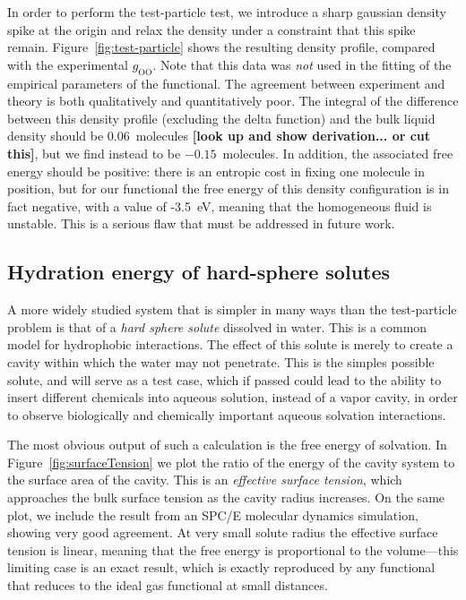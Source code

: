 \documentclass[letterpaper,twocolumn,amsmath,amssymb,prb]{revtex4-1}
\newcommand{\red}[1]{{\bf \color{red} #1}}
\newcommand{\fixme}[1]{\red{[#1]}}
\begin{document}
In order to perform the test-particle test, we introduce a sharp
gaussian density spike at the origin and relax the density under a
constraint that this spike remain.  Figure~\ref{fig:test-particle}
shows the resulting density profile, compared with the experimental
$g_{\textrm{OO}}$.  Note that this data was \emph{not} used in the
fitting of the empirical parameters of the functional.  The agreement
between experiment and theory is both qualitatively and quantitatively
poor.  The integral of the difference between this density profile
(excluding the delta function) and the bulk liquid density should be
0.06~molecules \fixme{look up and show derivation... or cut this},
but we find instead to be $-0.15$~molecules.  In addition, the associated
free energy should be positive: there is an entropic cost in fixing
one molecule in position, but for our functional the free energy of
this density configuration is in fact negative, with a value of
-3.5~eV, meaning that the homogeneous fluid is unstable.  This is a
serious flaw that must be addressed in future work.

\subsection{Hydration energy of hard-sphere solutes}

A more widely studied system that is simpler in many ways than the
test-particle problem is that of a \emph{hard sphere solute} dissolved
in water.  This is a common model for hydrophobic interactions.  The
effect of this solute is merely to create a cavity within which the
water may not penetrate.  This is the simples possible solute, and
will serve as a test case, which if passed could lead to the ability
to insert different chemicals into aqueous solution, instead of a
vapor cavity, in order to observe biologically and chemically
important aqueous solvation interactions.

The most obvious output of such a calculation is the free energy of
solvation.  In Figure~\ref{fig:surfaceTension} we plot the ratio of the
energy of the cavity system to the surface area of the cavity.  This
is an \emph{effective surface tension}, which approaches the bulk
surface tension as the cavity radius increases.  On the same plot, we
include the result from an SPC/E molecular dynamics
simulation\cite{huang2001shs}, showing very good agreement.  At very
small solute radius the effective surface tension is linear, meaning
that the free energy is proportional to the volume---this limiting
case is an exact result, which is exactly reproduced by any functional
that reduces to the ideal gas functional at small distances.
\end{document}

